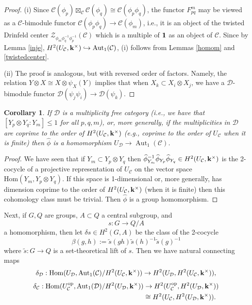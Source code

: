 \documentclass[12pt]{amsart}
\numberwithin{equation}{section}
\newtheorem{corollary}[theorem]{Corollary}
\theoremstyle{definition}
\newcommand{\Hom}{\text{Hom}}
\newcommand{\Aut}{\text{Aut}}
\newcommand{\1}{_{(1)}}
\newcommand{\2}{_{(2)}}
\newcommand{\3}{_{(3)}}
\newcommand{\4}{_{(4)}}
\newcommand{\5}{_{(5)}}
\newcommand{\6}{_{(6)}}
\newcommand{\C}{\mathcal{C}}
\theoremstyle{plain}
\theoremstyle{definition}
\theoremstyle{remark}
\def\C{\mathcal{C}}
\def\D{\mathcal{D}}
\def\Aut{\mathop{\mathrm{Aut}}\nolimits}
\def\Z{\mathcal{Z}}
\def\Hom{\mathrm{Hom}}
\begin{document}
\begin{proof} (i) Since 
$\C(\phi_p)\boxtimes_\C \C(\phi_q)\cong \C(\phi_p\phi_q)$, the functor $F_{pq}^m$ may be viewed as a $\C$-bimodule functor $\C(\phi_p\phi_q)\to \C(\phi_m)$, i.e., 
it is an object of the twisted Drinfeld center $\Z_{\phi_m\phi_q^{-1}\phi_p^{-1}}(\C)$ which is a multiple of $\bold 1$ as an object of $\C$. Since by Lemma \ref{inje}, $H^2(U_\C,\bold k^\times)\hookrightarrow \Aut_1(\C)$, (i) follows from Lemmas \ref{homom} and  \ref{twistedcenter}. 


(ii) The proof is analogous, but with reversed order of factors. Namely, the relation \(Y\otimes X\cong X\otimes \psi_X(Y)\) implies that when \(X_k\subset X_i\otimes X_j\), we have a $\D$-bimodule functor $\D(\psi_j\psi_i)\to \D(\psi_k)$. 
\end{proof}


\begin{corollary}\label{multfree} If $\D$ is a multiplicity free category (i.e., we have that 
$[Y_p\otimes Y_q:Y_m]\le 1$ for all $p,q,m$), or, more generally, if the multiplicities in $\D$ are coprime to 
the order of $H^2(U_\C,\bold k^\times)$ (e.g., coprime to the order of $U_\C$ when it is finite) then $\widehat\phi$ is a homomorphism 
$U_\D\to \Aut_1(\C)$. 
\end{corollary} 

\begin{proof} We have seen that if $Y_m\subset Y_p\otimes Y_q$ then $\widehat{\phi}_{Y_m}^{-1}\widehat{\phi}_{Y_p}\widehat{\phi}_{Y_q}\in H^2(U_\C,\bold k^\times)$
is the 2-cocycle of a projective representation of $U_\C$ on the vector space $\Hom(Y_m,Y_p\otimes Y_q)$. 
If this space is 1-dimensional or, more generally, 
has dimension coprime to the order of $H^2(U_\C,\bold k^\times)$ (when it is finite) then this cohomology class must be trivial. Then $\widehat\phi$ is a group homomorphism. 
\end{proof}  

Next, if $G,Q$ are groups, $A\subset Q$ a central subgroup, and 
$$
s: G\to Q/A
$$ 
a homomorphism, 
then let $\delta s \in  H^2(G,A)$ be the class of the 2-cocycle
$$
\beta(g,h):=\widetilde s(gh)\widetilde s(h)^{-1}\widetilde s(g)^{-1}
$$
where $\widetilde s: G\to Q$ is a set-theoretical lift of $s$.
Then we have natural connecting maps
$$
\delta_\D: \Hom(U_\D,\Aut_1(\C)/H^2(U_\C,\bold k^\times))\to H^2(U_\D,H^2(U_\C,\bold k^\times)),
$$ 
\[
\begin{aligned}
\delta_\C:
\Hom(U_\C^{\rm op},\Aut_1(\D)/H^2(U_\D,\bold k^\times))
&\to H^2(U_\C^{\rm op},H^2(U_\D,\bold k^\times))\\
&\cong H^2(U_\C,H^2(U_\D,\bold k^\times)).
\end{aligned}
\]
 
\end{document}
